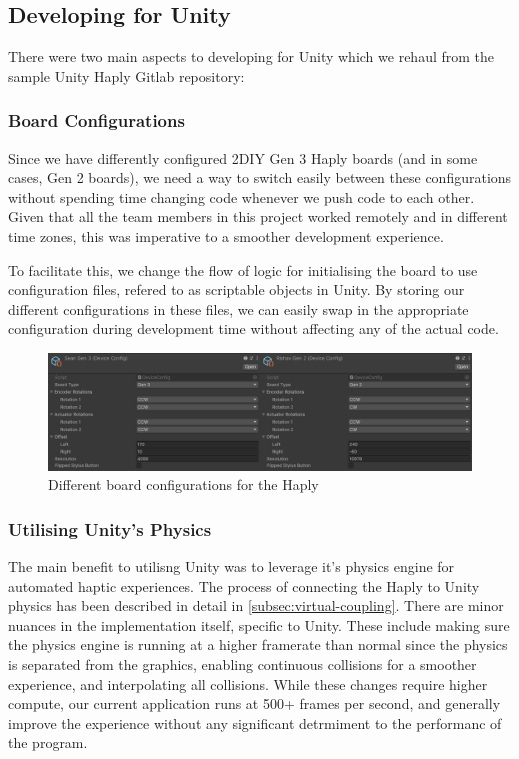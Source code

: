 \subsection{Developing for Unity}
There were two main aspects to developing for Unity which we rehaul from the sample Unity Haply Gitlab repository:
\subsubsection{Board Configurations}
Since we have differently configured 2DIY Gen 3 Haply boards (and in some cases, Gen 2 boards), we need a way to switch easily between these configurations without spending time changing code whenever we push code to each other. Given that all the team members in this project worked remotely and in different time zones, this was imperative to a smoother development experience. 

To facilitate this, we change the flow of logic for initialising the board to use configuration files, refered to as scriptable objects in Unity. By storing our different configurations in these files, we can easily swap in the appropriate configuration during development time without affecting any of the actual code.

\begin{figure}
    \centering
    \includegraphics[width = 1.0\textwidth]{images/board-config.png}
    \caption{Different board configurations for the Haply}
    \label{fig:board-config}
\end{figure}

\subsubsection{Utilising Unity's Physics}
The main benefit to utilisng Unity was to leverage it's physics engine for automated haptic experiences. The process of connecting the Haply to Unity physics has been described in detail in \ref{subsec:virtual-coupling}. There are minor nuances in  the implementation itself, specific to Unity. These include making sure the physics engine is running at a higher framerate than normal since the physics is separated from the graphics, enabling continuous collisions for a smoother experience, and interpolating all collisions. While these changes require higher compute, our current application runs at 500+ frames per second, and generally improve the experience without any significant detrmiment to the performanc of the program.


